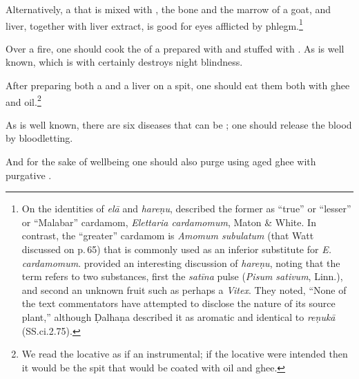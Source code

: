 \begin{translation}
    Alternatively, a  that is  mixed 
    with
, the bone and the marrow of a goat,
 and liver, together with liver extract, is good for eyes
afflicted by phlegm.\footnote{On the identities of \emph{elā} and
\emph{hareṇu}, \citet[511\,ff]{watt-comm} described the former as “true” or
“lesser” or “Malabar” cardamom, \emph{Elettaria cardamomum}, Maton \& White. 
In contrast, the “greater” cardamom is \textit{Amomum subulatum} (that Watt
discussed on p.\,65) that is commonly used as an inferior substitute for \textit{E.
cardamomum}. \citet[467\,f]{gvdb} provided an interesting discussion of
\emph{hareṇu}, noting that the term refers to two substances, first the
\emph{satīna} pulse (\emph{Pisum sativum}, Linn.), and second an unknown fruit such
as perhaps a \emph{Vitex}. They noted, “None of the text commentators have attempted
to disclose the nature of its source plant,” although Ḍalhaṇa described it as
aromatic and identical to \emph{reṇukā} (SS.ci.2.75).%
}
    
    \item[24] 
    
    Over a fire, one should cook the  of a  
    prepared
    with  and stuffed with .  As is well 
    known,  which is  with 
     certainly 
    destroys night blindness.
    
    
    \item [25] 
    
    After preparing both a  and a liver on a spit, one should eat them
    both with ghee and oil.\footnote{We read the locative as if an instrumental; if the
    locative were intended then it would be the spit that would be coated with oil and
    ghee.}
    
    \item [25cd--26ab]
    
    As is well known, there are  six diseases that can be ;
     one should release the blood by bloodletting.
    
    And for the sake of wellbeing one should also purge using aged ghee 
     with 
    purgative . 
    
    \item[26cd--27]
    

\end{translation}
